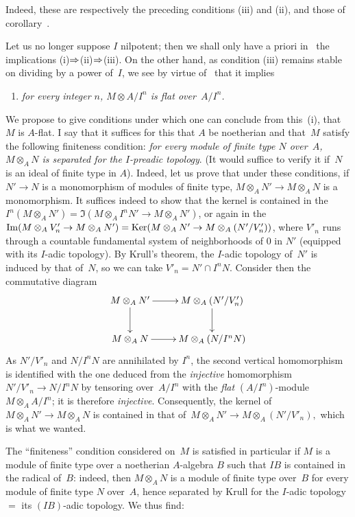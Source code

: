 Indeed, these are respectively the preceding conditions (iii) and (ii),
and those of corollary~.

Let us no longer suppose $I$ nilpotent; then we shall only have a priori
in~ the implications (i)$\To$(ii)$\To$(iii). On the other hand, as condition (iii) remains
stable on dividing by a power of~$I$, we see by virtue
of~ that it implies
\begin{enumerate}
\item[(iv)] \emph{for every integer $n$, $M \otimes A/I^n$ is flat over~$A/I^n$.}
\end{enumerate}
We propose to give conditions under which one can
conclude from this~(i), \ie that $M$ is $A$-flat. I say that it suffices for
this that $A$ be noetherian and that~$M$ satisfy the following
finiteness condition: \emph{for every module of finite type $N$ over~$A$, $M
\otimes_A N$ is separated for the
$I$-preadic topology}. (It would suffice to verify it if~$N$ is an
ideal of finite type in $A$). Indeed, let us prove that under these
conditions, if $N' \to N$ is a monomorphism of modules of finite
type, $M \otimes_A N' \to M \otimes_A N$ is a monomorphism. It
suffices indeed to show that the kernel is contained in the $I^n(M
\otimes_A N') = \Im(M \otimes_A I^n N' \to M \otimes_A N')$, or again
in the $\Im(M \otimes_A V'_n \to M \otimes_A N') = \Ker (M \otimes_A
N' \to M \otimes_A (N'/V'_n))$, where $V'_n$ runs through a countable
fundamental system of neighborhoods of 0 in $N'$ (equipped with its
$I$-adic topology). By Krull's theorem, the
$I$-adic topology of~$N'$ is induced by that of~$N$, so we can
take $V'_n = N' \cap I^n N$. Consider then the
commutative diagram
$$
\xymatrix{ M \otimes_A N' \ar[r] \ar[d] & M \otimes_A (N'/V'_n) \ar[d]
\\ M \otimes_A N \ar[r] & M \otimes_A (N / I^n N) }
$$
As $N'/V'_n$ and $N/I^n N$ are annihilated by $I^n$, the
second vertical homomorphism is identified with the one deduced
from the \emph{injective} homomorphism $N'/V'_n \to N/I^n N$ by
tensoring over~$A/I^n$ with the \emph{flat} $(A/I^n)$-module $M
\otimes_A A/I^n$; it is therefore \emph{injective}. Consequently, the kernel of
$M \otimes_A N' \to M \otimes_A N$ is contained in that of~$M
\otimes_A N' \to M \otimes_A (N'/V'_n),$ which is what we wanted.

The ``finiteness'' condition considered on~$M$ is
satisfied in particular if $M$ is a module of finite type over
a noetherian $A$-algebra
$B$ such that $IB$ is contained
in the radical of~$B$: indeed, then $M \otimes_A N$ is a module
of finite type over~$B$ for every module of finite type $N$ over~$A$, hence
separated by Krull for the $I$-adic topology $=$ its
$(IB)$-adic topology. We thus find:

